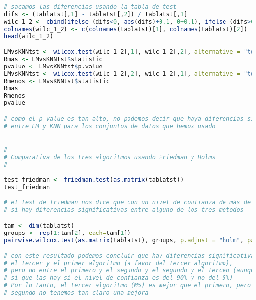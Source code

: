 \begin{lstlisting}[language=R]
# sacamos las diferencias usando la tabla de test
difs <- (tablatst[,1] - tablatst[,2]) / tablatst[,1]
wilc_1_2 <- cbind(ifelse (difs<0, abs(difs)+0.1, 0+0.1), ifelse (difs>0, abs(difs)+0.1, 0+0.1))
colnames(wilc_1_2) <- c(colnames(tablatst)[1], colnames(tablatst)[2])
head(wilc_1_2)

LMvsKNNtst <- wilcox.test(wilc_1_2[,1], wilc_1_2[,2], alternative = "two.sided", paired=TRUE)
Rmas <- LMvsKNNtst$statistic
pvalue <- LMvsKNNtst$p.value
LMvsKNNtst <- wilcox.test(wilc_1_2[,2], wilc_1_2[,1], alternative = "two.sided", paired=TRUE)
Rmenos <- LMvsKNNtst$statistic
Rmas
Rmenos
pvalue

# como el p-value es tan alto, no podemos decir que haya diferencias significativas
# entre LM y KNN para los conjuntos de datos que hemos usado


#
# Comparativa de los tres algoritmos usando Friedman y Holms
#

test_friedman <- friedman.test(as.matrix(tablatst))
test_friedman

# el test de friedman nos dice que con un nivel de confianza de más del 98%,
# si hay diferencias significativas entre alguno de los tres metodos

tam <- dim(tablatst)
groups <- rep(1:tam[2], each=tam[1])
pairwise.wilcox.test(as.matrix(tablatst), groups, p.adjust = "holm", paired = TRUE)

# con este resultado podemos concluir que hay diferencias significativas entre
# el tercer y el primer algoritmo (a favor del tercer algoritmo),
# pero no entre el primero y el segundo y el segundo y el terceo (aunque con este último
# si que las hay si el nivel de confianza es del 90% y no del 5%)
# Por lo tanto, el tercer algoritmo (M5) es mejor que el primero, pero con el
# segundo no tenemos tan claro una mejora

\end{lstlisting}
